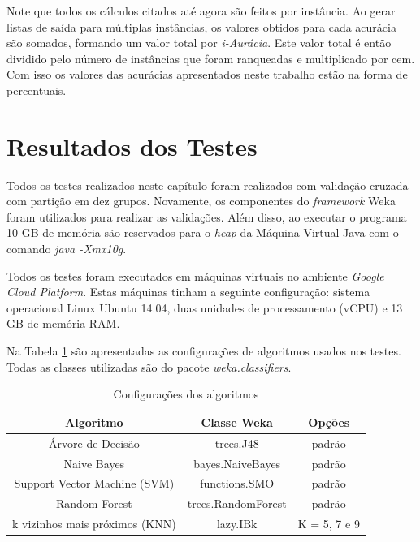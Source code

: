 Note que todos os cálculos citados até agora são feitos por instância. 
Ao gerar listas de saída para múltiplas instâncias, os valores obtidos para cada acurácia são somados, formando um valor total por \textit{i-Aurácia}.
Este valor total é então dividido pelo número de instâncias que foram ranqueadas e multiplicado por cem.
Com isso os valores das acurácias apresentados neste trabalho estão na forma de percentuais.

\section{Resultados dos Testes}

Todos os testes realizados neste capítulo foram realizados com validação cruzada com partição em dez grupos.
Novamente, os componentes do \textit{framework} Weka foram utilizados para realizar as validações.
Além disso, ao executar o programa 10 GB de memória são reservados para o \textit{heap} da Máquina Virtual Java com o comando \textit{java -Xmx10g}.

Todos os testes foram executados em máquinas virtuais no ambiente \textit{Google Cloud Platform}. 
Estas máquinas tinham a seguinte configuração: sistema operacional Linux Ubuntu 14.04, duas unidades de processamento (vCPU) e 13 GB de memória RAM.

Na Tabela \ref{tab:algoritmostestes} são apresentadas as configurações de algoritmos usados nos testes. Todas as classes utilizadas são do pacote \textit{weka.classifiers}.

\begin{table}[h!]
  \begin{center}
    \begin{tabular}{ccc}
      \hline
      \textbf{Algoritmo} & \textbf{Classe Weka} & \textbf{Opções} \\
      \hline

      Árvore de Decisão & trees.J48 & padrão \\
      Naive Bayes & bayes.NaiveBayes & padrão \\
      Support Vector Machine (SVM) & functions.SMO & padrão \\
      Random Forest & trees.RandomForest & padrão \\
      k vizinhos mais próximos (KNN) & lazy.IBk & K = 5, 7 e 9 \\

      \hline
    \end{tabular}
    \caption{Configurações dos algoritmos}
    \label{tab:algoritmostestes}
  \end{center}
\end{table}

